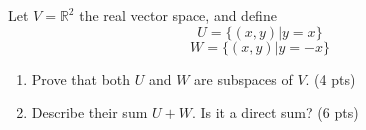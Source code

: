 \documentclass{amsart}
\begin{document}
	
\vspace{2em}
Let $V=\mathbb{R}^2$ the real vector space, and define
\[U = \{(x,y) | y=x\}\]
\[W = \{(x,y) | y=-x\}\]

\begin{enumerate}
	\item Prove that both $U$ and $W$ are subspaces of $V$. (4 pts)
	\vspace{8cm}
	\item Describe their sum $U+W$. Is it a direct sum? (6 pts)
\end{enumerate}


%
%
\end{document}
